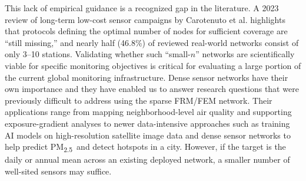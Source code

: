 \documentclass[12pt]{article}
\theoremstyle{remark}
\newcommand{\pmtt}{\textrm{PM\textsubscript{2.5}}}
\begin{document}
This lack of empirical guidance is a recognized gap in the literature. A 2023 review of long-term low-cost sensor campaigns by Carotenuto et al. highlights that protocols defining the optimal number of nodes for sufficient coverage are ``still missing,'' and nearly half (46.8\%) of reviewed real-world networks consist of only 3–10 stations.\supercite{carotenuto_low-cost_2023} Validating whether such ``small-$n$'' networks are scientifically viable for specific monitoring objectives is critical for evaluating a large portion of the current global monitoring infrastructure. Dense sensor networks have their own importance and they have enabled us to answer research questions that were previously difficult to address using the sparse FRM/FEM network. Their applications range from mapping neighborhood-level air quality and supporting exposure-gradient analyses to newer data-intensive approaches such as training AI models on high-resolution satellite image data and dense sensor networks to help predict \pmtt\ and detect hotspots in a city. However, if the target is the daily or annual mean across an existing deployed network, a smaller number of well-sited sensors may suffice. 
\end{document}
